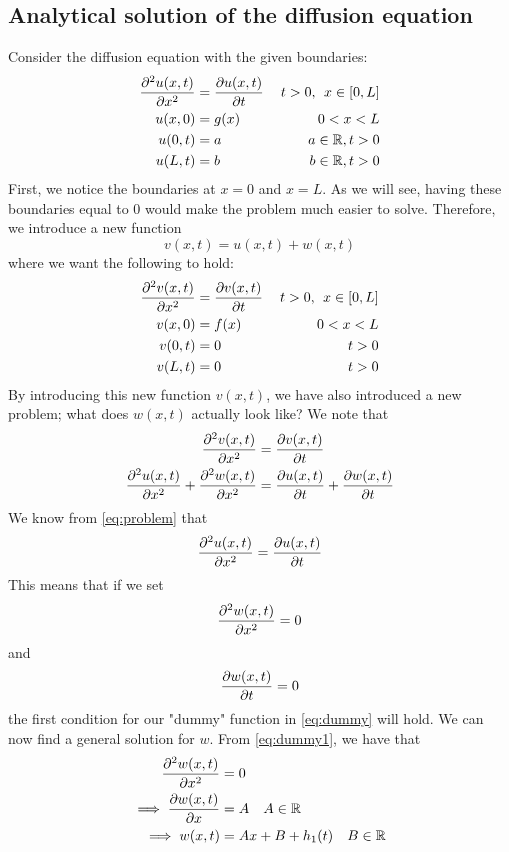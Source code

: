 \documentclass[12pt,english,a4paper]{article}
\begin{document}
\subsection{Analytical solution of the diffusion equation}
Consider the diffusion equation with the given boundaries:
\begin{equation}\label{eq:problem}
\begin{aligned}
\pdv[2]{u(x,t)}{x} &= \pdv{u(x,t)}{t} &\: t>0, \:\:x\in[0,L] \\
u(x,0) &= g(x)  &0 < x < L\\
u(0,t) &=  a & a \in \mathbb{R},  t>0 \\
u(L,t) &= b &b \in \mathbb{R}, t>0
\end{aligned}
\end{equation}
First, we notice the boundaries at \(x = 0\) and \(x = L\). As we will see, having these boundaries equal to 0 would make the problem much easier to solve. Therefore, we introduce a new function
\[
v(x,t) = u(x,t) + w(x,t)
\]
where we want the following to hold:
\begin{equation}\label{eq:dummy}
\begin{aligned}
\pdv[2]{v(x,t)}{x} &= \pdv{v(x,t)}{t} &\: t>0, \:\:x\in[0,L] \\
v(x,0) &= f(x)  &0 < x < L\\
v(0,t) &=  0 &  t>0 \\
v(L,t) &= 0 & t>0
\end{aligned}
\end{equation}
By introducing this new function \(v(x,t)\), we have also introduced a new problem; what does \(w(x,t)\) actually look like? We note that 
\begin{alignat*}{2}
\pdv[2]{v(x,t)}{x} &= \pdv{v(x,t)}{t}  \\
\pdv[2]{u(x,t)}{x} + \pdv[2]{w(x,t)}{x} &= \pdv{u(x,t)}{t} + \pdv{w(x,t)}{t} 
\end{alignat*}
We know from \ref{eq:problem} that 
\[
\pdv[2]{u(x,t)}{x} = \pdv{u(x,t)}{t}
\]
This means that if we set 
\begin{equation} \label{eq:dummy1}
 \pdv[2]{w(x,t)}{x}  = 0
\end{equation}
and 
\begin{equation} \label{eq:dummy2}
 \pdv{w(x,t)}{t} = 0 
\end{equation}
the first condition for our "dummy" function in \vref{eq:dummy} will hold. We can now find a general solution for \(w\). From \vref{eq:dummy1}, we have that 
\begin{align}
	\pdv[2]{w(x,t)}{x}  &= 0 \nonumber \\
	\implies\pdv{w(x,t)}{x} &= A  \quad A \in \mathbb{R} \nonumber \\
	\implies w(x,t) &= Ax + B + h_1(t) \quad B \in \mathbb{R} \label{eq:wX}
\end{align}
\end{document}
